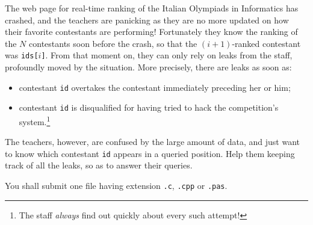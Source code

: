 \usepackage{xcolor}
\usepackage{afterpage}
\usepackage{pifont,mdframed}
\usepackage[bottom]{footmisc}



\newcommand{\inputfile}{\texttt{stdin}}
\newcommand{\outputfile}{\texttt{stdout}}

\newenvironment{warning}
  {\par\begin{mdframed}[linewidth=2pt,linecolor=gray]%
    \begin{list}{}{\leftmargin=1cm
                   \labelwidth=\leftmargin}\item[\Large\ding{43}]}
  {\end{list}\end{mdframed}\par}



	The web page for real-time ranking of the Italian Olympiads in Informatics has crashed, and the teachers are panicking as they are no more updated on how their favorite contestants are performing! Fortunately they know the ranking of the $N$ contestants soon before the crash, so that the $(i+1)$-ranked contestant was \texttt{ids[$i$]}. From that moment on, they can only rely on leaks from the staff, profoundly moved by the situation. More precisely, there are leaks as soon as:
	\begin{itemize}
		\item contestant \texttt{id} overtakes the contestant immediately preceding her or him;
		\item contestant \texttt{id} is disqualified for having tried to hack the competition's system.\footnote{The staff \emph{always} find out quickly about every such attempt!} 
	\end{itemize}
	The teachers, however, are confused by the large amount of data, and just want to know which contestant \texttt{id} appears in a queried position. Help them keeping track of all the leaks, so as to answer their queries.


\Implementation

You shall submit one file having extension \texttt{.c}, \texttt{.cpp} or \texttt{.pas}.

